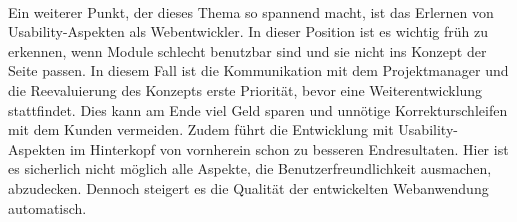 \\
Ein weiterer Punkt, der dieses Thema so spannend macht, ist das Erlernen von Usability-Aspekten als Webentwickler. In dieser Position ist es wichtig früh zu erkennen, wenn Module schlecht benutzbar sind und sie nicht ins Konzept der Seite passen. In diesem Fall ist die Kommunikation mit dem Projektmanager und die Reevaluierung des Konzepts erste Priorität, bevor eine Weiterentwicklung stattfindet. Dies kann am Ende viel Geld sparen und unnötige Korrekturschleifen mit dem Kunden vermeiden. Zudem führt die Entwicklung mit Usability-Aspekten im Hinterkopf von vornherein schon zu besseren Endresultaten. Hier ist es sicherlich nicht möglich alle Aspekte, die Benutzerfreundlichkeit ausmachen, abzudecken. Dennoch steigert es die Qualität der entwickelten Webanwendung automatisch.